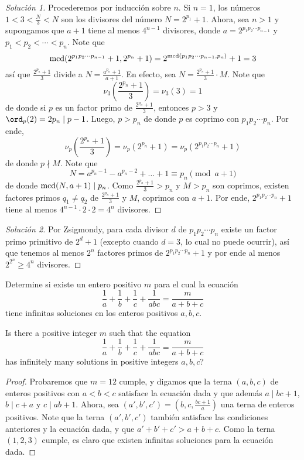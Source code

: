 \begin{proof}[Solución 1]
  Procederemos por inducción sobre $n$. Si $n=1$, los números
  $1<3<\frac{N}{3}<N$ son los divisores del número $N=2^{p_1}+1$. Ahora, sea
  $n>1$ y supongamos que $a+1$ tiene al menos $4^{n-1}$ divisores, donde
  $a=2^{p_1p_2\cdots p_{n-1}}$ y $p_1<p_2<\cdots<p_n$. Note que
  \[
    \operatorname{mcd}(2^{p_1p_2\cdots p_{n-1}}+1,2^{p_n}+1)
    =2^{\operatorname{mcd}(p_1p_2\cdots p_{n-1},p_n)}+1
    =3
  \]
  así que $\frac{2^{p_n}+1}{3}$ divide a $N=\frac{a^{p_n}+1}{a+1}$. En efecto,
  sea $N=\frac{2^{p_n}+1}{3}\cdot M$. Note que
  \[\nu_3\left(\frac{2^{p_n}+1}{3}\right)=\nu_3(3)=1\]
  de donde si $p$ es un factor primo de $\frac{2^{p_n}+1}{3}$, entonces $p>3$ y
  $\ord_p(2)=2p_n\mid p-1$. Luego, $p>p_n$ de donde $p$ es coprimo con
  $p_1p_2\cdots p_n$. Por ende,
  \[
    \nu_p\left(\frac{2^{p_n}+1}{3}\right)
    =\nu_p(2^{p_n}+1)
    =\nu_p(2^{p_1p_2\cdots p_n}+1)
  \]
  de donde $p\nmid M$. Note que
  \[N=a^{p_n-1}-a^{p_n-2}+\dots+1\equiv p_n\pmod{a+1}\]
  de donde $\operatorname{mcd}(N,a+1)\mid p_n$. Como $\frac{2^{p_n}+1}{3}>p_n$ y $M>p_n$ son
  coprimos, existen factores primos $q_1\ne q_2$ de $\frac{2^{p_n}+1}{3}$ y $M$,
  coprimos con $a+1$. Por ende, $2^{p_1p_2\cdots p_n}+1$ tiene al menos
  $4^{n-1}\cdot 2\cdot 2=4^n$ divisores.
\end{proof}

\begin{proof}[Solución 2]
  Por Zsigmondy, para cada divisor $d$ de $p_1p_2\cdots p_n$ existe un factor
  primo primitivo de $2^d+1$ (excepto cuando $d=3$, lo cual no puede ocurrir),
  así que tenemos al menos $2^n$ factores primos de $2^{p_1p_2\cdots p_n}+1$ y
  por ende al menos $2^{2^n}\ge 4^n$ divisores.
\end{proof}


\begin{probEG}[ISL 2002/N4]
  Determine si existe un entero positivo $m$ para el cual la ecuación
  \[\frac1a+\frac1b+\frac1c+\frac{1}{abc}=\frac{m}{a+b+c}\]
  tiene infinitas soluciones en los enteros positivos $a,b,c$.
  \begin{hint}
    Is there a positive integer $m$ such that the equation
    \[\frac1a+\frac1b+\frac1c+\frac{1}{abc}=\frac{m}{a+b+c}\]
    has infinitely many solutions in positive integers $a,b,c$?
  \end{hint}
\end{probEG}

\begin{proof}
  Probaremos que $m=12$ cumple, y digamos que la terna $(a,b,c)$ de enteros
  positivos con $a<b<c$ satisface la ecuación dada y que además $a\mid bc+1$,
  $b\mid c+a$ y $c\mid ab+1$. Ahora, sea
  $(a',b',c')=\left(b,c,\frac{bc+1}{a}\right)$ una terna de enteros positivos.
  Note que la terna $(a',b',c')$ también satisface las condiciones anteriores y
  la ecuación dada, y que $a'+b'+c'>a+b+c$. Como la terna $(1,2,3)$ cumple, es
  claro que existen infinitas soluciones para la ecuación dada.
\end{proof}

